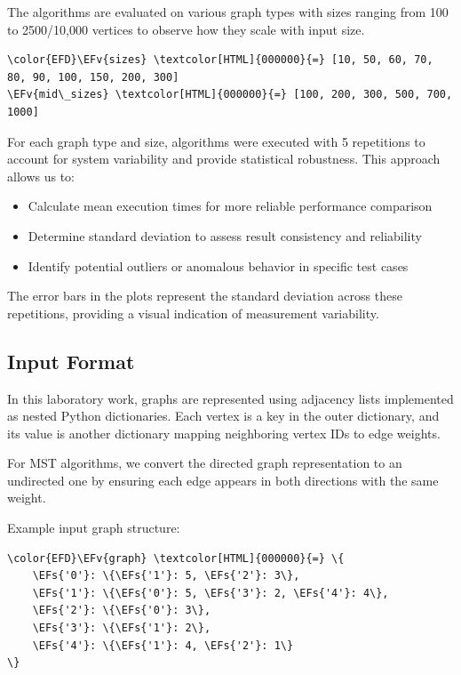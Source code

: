 \documentclass[a4paper,12pt]{article}
\newcommand{\EFs}[1]{\textcolor{EFs}{#1}} %
\newcommand{\EFv}[1]{\textcolor{EFv}{#1}} %
\begin{document}
The algorithms are evaluated on various graph types with sizes ranging from 100 to 2500/10,000 vertices to observe how they scale with input size.

\begin{Code}
\begin{Verbatim}
\color{EFD}\EFv{sizes} \textcolor[HTML]{000000}{=} [10, 50, 60, 70, 80, 90, 100, 150, 200, 300]
\EFv{mid\_sizes} \textcolor[HTML]{000000}{=} [100, 200, 300, 500, 700, 1000]
\end{Verbatim}
\end{Code}

For each graph type and size, algorithms were executed with 5 repetitions to account for system variability and provide statistical robustness. This approach allows us to:

\begin{itemize}
\item Calculate mean execution times for more reliable performance comparison
\item Determine standard deviation to assess result consistency and reliability
\item Identify potential outliers or anomalous behavior in specific test cases
\end{itemize}

The error bars in the plots represent the standard deviation across these repetitions, providing a visual indication of measurement variability.
\subsection{Input Format}
\label{sec:org48b6592}
In this laboratory work, graphs are represented using adjacency lists implemented as nested Python dictionaries. Each vertex is a key in the outer dictionary, and its value is another dictionary mapping neighboring vertex IDs to edge weights.

For MST algorithms, we convert the directed graph representation to an undirected one by ensuring each edge appears in both directions with the same weight.

Example input graph structure:
\begin{Code}
\begin{Verbatim}
\color{EFD}\EFv{graph} \textcolor[HTML]{000000}{=} \{
    \EFs{'0'}: \{\EFs{'1'}: 5, \EFs{'2'}: 3\},
    \EFs{'1'}: \{\EFs{'0'}: 5, \EFs{'3'}: 2, \EFs{'4'}: 4\},
    \EFs{'2'}: \{\EFs{'0'}: 3\},
    \EFs{'3'}: \{\EFs{'1'}: 2\},
    \EFs{'4'}: \{\EFs{'1'}: 4, \EFs{'2'}: 1\}
\}
\end{Verbatim}
\end{Code}
\end{document}
